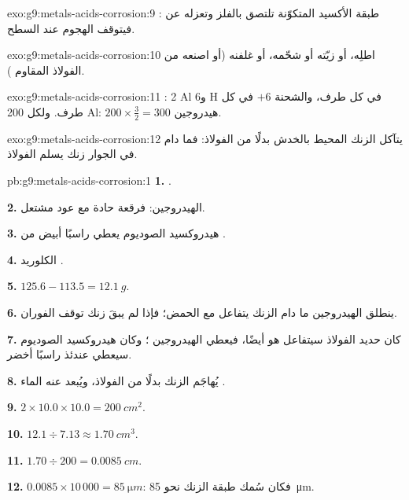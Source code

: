 \begin{solution}{exo:g9:metals-acids-corrosion:9}
طبقة الأكسيد المتكوّنة تلتصق بالفلز وتعزله عن : فيتوقف الهجوم عند
السطح.
\end{solution}

\begin{solution}{exo:g9:metals-acids-corrosion:10}
اطلِه، أو زيّته أو شحّمه، أو غلفنه (أو اصنعه من الفولاذ المقاوم ).
\end{solution}

\begin{solution}{exo:g9:metals-acids-corrosion:11}
: 2 Al و6 H في كل طرف،
والشحنة $+6$ في كل طرف. ولكل 200  Al: $200 \times \frac{3}{2} = 300$
 هيدروجين.
\end{solution}

\begin{solution}{exo:g9:metals-acids-corrosion:12}
يتآكل الزنك المحيط بالخدش بدلًا من الفولاذ: فما دام في الجوار زنك يسلم
الفولاذ.
\end{solution}

\begin{solution}{pb:g9:metals-acids-corrosion:1}
\textbf{1.} .

\textbf{2.} الهيدروجين: فرقعة حادة مع عود مشتعل.

\textbf{3.} هيدروكسيد الصوديوم يعطي راسبًا أبيض من
.

\textbf{4.}  الكلوريد .

\textbf{5.} $125.6 - 113.5 = \qty{12.1}{g}$.

\textbf{6.} ينطلق الهيدروجين ما دام الزنك يتفاعل مع الحمض؛ فإذا لم يبقَ
زنك توقف الفوران.

\textbf{7.} كان حديد الفولاذ سيتفاعل هو أيضًا، فيعطي الهيدروجين 
؛ وكان هيدروكسيد الصوديوم سيعطي عندئذ راسبًا أخضر.

\textbf{8.} يُهاجَم الزنك بدلًا من الفولاذ، ويُبعد عنه الماء
.

\textbf{9.} $2 \times 10.0 \times 10.0 = \qty{200}{cm^2}$.

\textbf{10.} $12.1 \div 7.13 \approx \qty{1.70}{cm^3}$.

\textbf{11.} $1.70 \div 200 = \qty{0.0085}{cm}$.

\textbf{12.} $0.0085 \times 10\,000 = \qty{85}{\micro m}$: فكان سُمك طبقة
الزنك نحو \qty{85}{\micro m}.
\end{solution}
